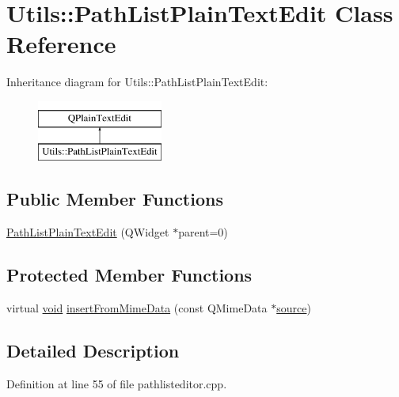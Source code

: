 \hypertarget{class_utils_1_1_path_list_plain_text_edit}{\section{Utils\-:\-:Path\-List\-Plain\-Text\-Edit Class Reference}
\label{class_utils_1_1_path_list_plain_text_edit}
}
Inheritance diagram for Utils\-:\-:Path\-List\-Plain\-Text\-Edit\-:\begin{figure}[H]
\begin{center}
\leavevmode
\includegraphics[height=2.000000cm]{class_utils_1_1_path_list_plain_text_edit}
\end{center}
\end{figure}
\subsection*{Public Member Functions}
\begin{DoxyCompactItemize}
\item 
\hyperlink{class_utils_1_1_path_list_plain_text_edit_aa70aad84201092e4c61bef00397cad79}{Path\-List\-Plain\-Text\-Edit} (Q\-Widget $\ast$parent=0)
\end{DoxyCompactItemize}
\subsection*{Protected Member Functions}
\begin{DoxyCompactItemize}
\item 
virtual \hyperlink{group___u_a_v_objects_plugin_ga444cf2ff3f0ecbe028adce838d373f5c}{void} \hyperlink{class_utils_1_1_path_list_plain_text_edit_adcdbdbbe651b3482f0edde0fe096d6e4}{insert\-From\-Mime\-Data} (const Q\-Mime\-Data $\ast$\hyperlink{glext_8h_afdd0f0e67e302eefcb4f6b23732e7ea3}{source})
\end{DoxyCompactItemize}


\subsection{Detailed Description}


Definition at line 55 of file pathlisteditor.\-cpp.



